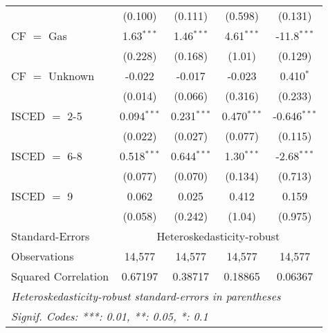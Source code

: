 \begin{table}[htbp!]
\begin{adjustbox}{width = 1\textwidth, max height = 0.95\textheight, center}
\begin{threeparttable}[b]
\begin{tabular}{lcccc}
                                 & (0.100)            & (0.111)            & (0.598)       & (0.131)\\   
            CF $=$ Gas           & 1.63$^{***}$       & 1.46$^{***}$       & 4.61$^{***}$  & -11.8$^{***}$\\   
                                 & (0.228)            & (0.168)            & (1.01)        & (0.129)\\   
            CF $=$ Unknown       & -0.022             & -0.017             & -0.023        & 0.410$^{*}$\\   
                                 & (0.014)            & (0.066)            & (0.316)       & (0.233)\\   
            ISCED $=$ 2-5        & 0.094$^{***}$      & 0.231$^{***}$      & 0.470$^{***}$ & -0.646$^{***}$\\   
                                 & (0.022)            & (0.027)            & (0.077)       & (0.115)\\   
            ISCED $=$ 6-8        & 0.518$^{***}$      & 0.644$^{***}$      & 1.30$^{***}$  & -2.68$^{***}$\\   
                                 & (0.077)            & (0.070)            & (0.134)       & (0.713)\\   
            ISCED $=$ 9          & 0.062              & 0.025              & 0.412         & 0.159\\   
                                 & (0.058)            & (0.242)            & (1.04)        & (0.975)\\   
            \midrule 
            Standard-Errors & \multicolumn{4}{c}{Heteroskedasticity-robust} \\ 
            Observations         & 14,577             & 14,577             & 14,577        & 14,577\\  
            Squared Correlation  & 0.67197            & 0.38717            & 0.18865       & 0.06367\\  
            \midrule \midrule
            \multicolumn{5}{l}{\emph{Heteroskedasticity-robust standard-errors in parentheses}}\\
            \multicolumn{5}{l}{\emph{Signif. Codes: ***: 0.01, **: 0.05, *: 0.1}}\\
         \end{tabular}
         

\end{threeparttable}
\end{adjustbox}
\end{table}
